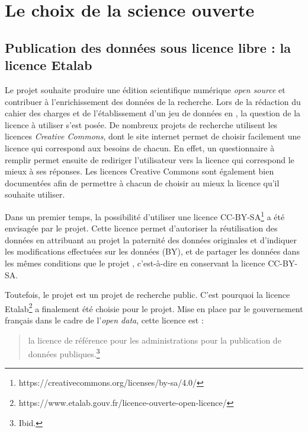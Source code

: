 \section{Le choix de la science ouverte}
    \subsection{Publication des données sous licence libre : la licence Etalab}

Le projet \COREL souhaite produire une édition scientifique numérique \textit{open source} et contribuer à l'enrichissement des données de la recherche. Lors de la rédaction du cahier des charges et de l'établissement d'un jeu de données en \TEI, la question de la licence à utiliser s'est posée. De nombreux projets de recherche utilisent les licences \textit{Creative Commons}, dont le site internet permet de choisir facilement une licence qui correspond aux besoins de chacun. En effet, un questionnaire à remplir permet ensuite de rediriger l'utilisateur vers la licence qui correspond le mieux à ses réponses. Les licences Creative Commons sont également bien documentées afin de permettre à chacun de choisir au mieux la licence qu'il souhaite utiliser. 

Dans un premier temps, la possibilité d'utiliser une licence CC-BY-SA\footnote{https://creativecommons.org/licenses/by-sa/4.0/} a été envisagée par le projet. Cette licence permet d'autoriser la réutilisation des données en attribuant au projet \COREL la paternité des données originales et d'indiquer les modifications effectuées sur les données (BY), et de partager les données dans les mêmes conditions que le projet \COREL, c'est-à-dire en conservant la licence CC-BY-SA. 

Toutefois, le projet \COREL est un projet de recherche public. C'est pourquoi la licence Etalab\footnote{https://www.etalab.gouv.fr/licence-ouverte-open-licence/} a finalement été choisie pour le projet. Mise en place par le gouvernement français dans le cadre de l'\textit{open data}, cette licence est : 

\begin{quote}
    la licence de référence pour les administrations pour la publication de données publiques.\footnote{Ibid.}
\end{quote}

